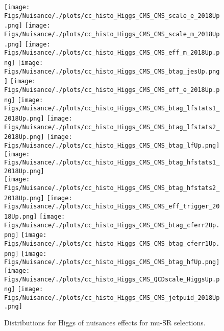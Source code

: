 \begin{figure*}[htbp]  
\centering 
\texttt{[image: Figs/Nuisance/./plots/cc\_histo\_Higgs\_CMS\_CMS\_scale\_e\_2018Up.png]}
\texttt{[image: Figs/Nuisance/./plots/cc\_histo\_Higgs\_CMS\_CMS\_scale\_m\_2018Up.png]}
\texttt{[image: Figs/Nuisance/./plots/cc\_histo\_Higgs\_CMS\_CMS\_eff\_m\_2018Up.png]}
\texttt{[image: Figs/Nuisance/./plots/cc\_histo\_Higgs\_CMS\_CMS\_btag\_jesUp.png]}
\texttt{[image: Figs/Nuisance/./plots/cc\_histo\_Higgs\_CMS\_CMS\_eff\_e\_2018Up.png]}
\texttt{[image: Figs/Nuisance/./plots/cc\_histo\_Higgs\_CMS\_CMS\_btag\_lfstats1\_2018Up.png]}
\texttt{[image: Figs/Nuisance/./plots/cc\_histo\_Higgs\_CMS\_CMS\_btag\_lfstats2\_2018Up.png]}
\texttt{[image: Figs/Nuisance/./plots/cc\_histo\_Higgs\_CMS\_CMS\_btag\_lfUp.png]}
\texttt{[image: Figs/Nuisance/./plots/cc\_histo\_Higgs\_CMS\_CMS\_btag\_hfstats1\_2018Up.png]}\\
\texttt{[image: Figs/Nuisance/./plots/cc\_histo\_Higgs\_CMS\_CMS\_btag\_hfstats2\_2018Up.png]}
\texttt{[image: Figs/Nuisance/./plots/cc\_histo\_Higgs\_CMS\_CMS\_eff\_trigger\_2018Up.png]}
\texttt{[image: Figs/Nuisance/./plots/cc\_histo\_Higgs\_CMS\_CMS\_btag\_cferr2Up.png]}
\texttt{[image: Figs/Nuisance/./plots/cc\_histo\_Higgs\_CMS\_CMS\_btag\_cferr1Up.png]}
\texttt{[image: Figs/Nuisance/./plots/cc\_histo\_Higgs\_CMS\_CMS\_btag\_hfUp.png]}
\texttt{[image: Figs/Nuisance/./plots/cc\_histo\_Higgs\_CMS\_QCDscale\_HiggsUp.png]}
\texttt{[image: Figs/Nuisance/./plots/cc\_histo\_Higgs\_CMS\_CMS\_jetpuid\_2018Up.png]}
\\ 
\caption{ 
   Distributions for Higgs of nuisances effects for mu-SR selections.
} 
\label{fig:Higgs_mu_SR} 
\end{figure*} 




